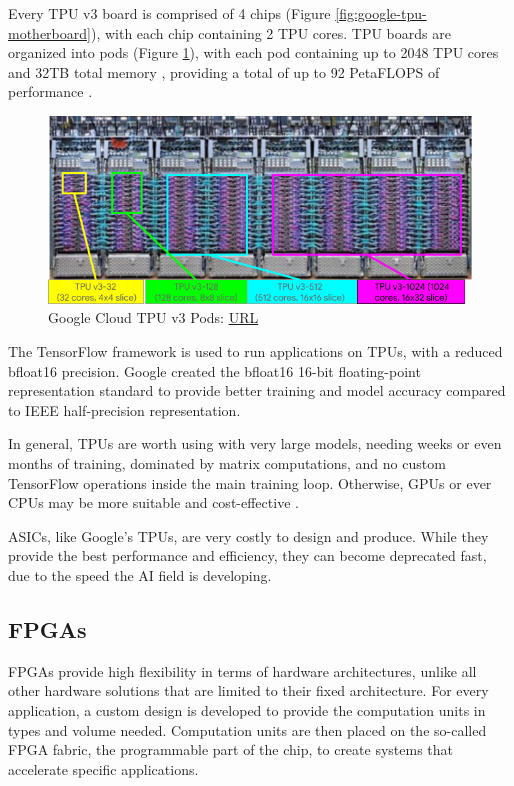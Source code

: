 Every TPU v3 board is comprised of 4 chips (Figure \ref{fig:google-tpu-motherboard}), with each chip containing 2 TPU cores. TPU boards are organized into pods (Figure \ref{fig:tpu-v3-pods}), with each pod containing up to 2048 TPU cores and 32TB total memory \cite{Google-Cloud-TPU}, providing a total of up to 92 PetaFLOPS of performance \cite{Tensor-Processing-Unit-Wikipedia}.

\begin{figure} [H]
	\centering
	\includegraphics[width=\textwidth]{Images/Hardware/tpu-v3-pods.png}
	\decoRule
	\caption[Google Cloud TPU v3 Pods]{Google Cloud TPU v3 Pods: \href{https://cloud.google.com/tpu/docs/system-architecture}{URL}}
	\label{fig:tpu-v3-pods}
\end{figure}

The TensorFlow framework is used to run applications on TPUs, with a reduced bfloat16 precision. Google created the bfloat16 16-bit floating-point representation standard to provide better training and model accuracy compared to IEEE half-precision representation.

In general, TPUs are worth using with very large models, needing weeks or even months of training, dominated by matrix computations, and no custom TensorFlow operations inside the main training loop. Otherwise, GPUs or ever CPUs may be more suitable and cost-effective \cite{Cloud-Tensor-Processing-Units}.

ASICs, like Google's TPUs, are very costly to design and produce. While they provide the best performance and efficiency, they can become deprecated fast, due to the speed the AI field is developing.

\subsection{FPGAs}
FPGAs provide high flexibility in terms of hardware architectures, unlike all other hardware solutions that are limited to their fixed architecture. For every application, a custom design is developed to provide the computation units in types and volume needed. Computation units are then placed on the so-called FPGA fabric, the programmable part of the chip, to create systems that accelerate specific applications.


